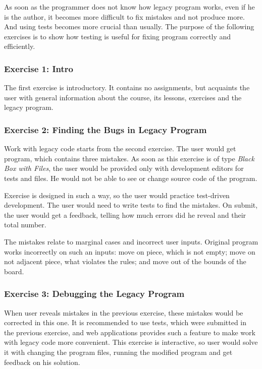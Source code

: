     As soon as the programmer does not know how legacy program works, even if he is the author, it becomes more difficult to fix mistakes and not produce more. And using tests becomes more crucial than usually. The purpose of the following exercises is to show how testing is useful for fixing program correctly and efficiently.
    
        \subsubsection{Exercise 1: Intro}
        The first exercise is introductory. It contains no assignments, but acquaints the user with general information about the course, its lessons, exercises and the legacy program.
        
        \subsubsection{Exercise 2: Finding the Bugs in Legacy Program}
        Work with legacy code starts from the second exercise. The user would get program, which contains three mistakes. As soon as this exercise is of type \textit{Black Box with Files}, the user would be provided only with development editors for tests and files. He would not be able to see or change source code of the program.
        
        Exercise is designed in such a way, so the user would practice test-driven development. The user would need to write tests to find the mistakes. On submit, the user would get a feedback, telling how much errors did he reveal and their total number.
        
        The mistakes relate to marginal cases and incorrect user inputs. Original program works incorrectly on such an inputs: move on piece, which is not empty; move on not adjacent piece, what violates the rules; and move out of the bounds of the board.
        
        \subsubsection{Exercise 3: Debugging the Legacy Program}
        When user reveals mistakes in the previous exercise, these mistakes would be corrected in this one. It is recommended to use tests, which were submitted in the previous exercise, and web applications provides such a feature to make work with legacy code more convenient. This exercise is interactive, so user would solve it with changing the program files, running the modified program and get feedback on his solution.
        
